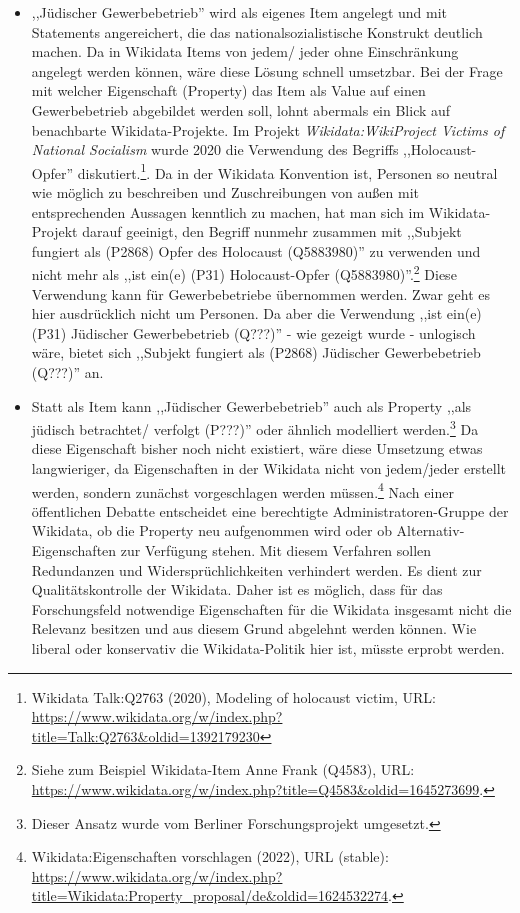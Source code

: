\begin{itemize}
    \item ,,Jüdischer Gewerbebetrieb'' wird als eigenes Item angelegt und mit Statements angereichert, die das nationalsozialistische Konstrukt deutlich machen. Da in Wikidata Items von jedem/ jeder ohne Einschränkung angelegt werden können, wäre diese Lösung schnell umsetzbar. Bei der Frage mit welcher Eigenschaft (Property) das Item als Value auf einen Gewerbebetrieb abgebildet werden soll, lohnt abermals ein Blick auf benachbarte Wikidata-Projekte. Im Projekt \textit{Wikidata:WikiProject Victims of National Socialism} wurde 2020 die Verwendung des Begriffs ,,Holocaust-Opfer'' diskutiert.\footnote{Wikidata Talk:Q2763 (2020), Modeling of holocaust victim, URL: \url{https://www.wikidata.org/w/index.php?title=Talk:Q2763&oldid=1392179230}}. Da in der Wikidata Konvention ist, Personen so neutral wie möglich zu beschreiben und Zuschreibungen von außen mit entsprechenden Aussagen kenntlich zu machen, hat man sich im Wikidata-Projekt darauf geeinigt, den Begriff nunmehr zusammen mit ,,Subjekt fungiert als (P2868) Opfer des Holocaust (Q5883980)'' zu verwenden und nicht mehr als ,,ist ein(e) (P31) Holocaust-Opfer (Q5883980)''.\footnote{Siehe zum Beispiel Wikidata-Item Anne Frank (Q4583), URL: \url{https://www.wikidata.org/w/index.php?title=Q4583&oldid=1645273699}.} Diese Verwendung kann für Gewerbebetriebe übernommen werden. Zwar geht es hier ausdrücklich nicht um Personen. Da aber die Verwendung ,,ist ein(e) (P31) Jüdischer Gewerbebetrieb (Q???)'' - wie gezeigt wurde - unlogisch wäre, bietet sich ,,Subjekt fungiert als (P2868) Jüdischer Gewerbebetrieb (Q???)'' an.
    \item Statt als Item kann ,,Jüdischer Gewerbebetrieb'' auch als Property ,,als jüdisch betrachtet/ verfolgt (P???)'' oder ähnlich modelliert werden.\footnote{Dieser Ansatz wurde vom Berliner Forschungsprojekt umgesetzt.} Da diese Eigenschaft bisher noch nicht existiert, wäre diese Umsetzung etwas langwieriger, da Eigenschaften in der Wikidata nicht von jedem/jeder erstellt werden, sondern zunächst vorgeschlagen werden müssen.\footnote{Wikidata:Eigenschaften vorschlagen (2022), URL (stable): \url{https://www.wikidata.org/w/index.php?title=Wikidata:Property_proposal/de&oldid=1624532274}.} Nach einer öffentlichen Debatte entscheidet eine berechtigte Administratoren-Gruppe der Wikidata, ob die Property neu aufgenommen wird oder ob Alternativ-Eigenschaften zur Verfügung stehen. Mit diesem Verfahren sollen Redundanzen und Widersprüchlichkeiten verhindert werden. Es dient zur Qualitätskontrolle der Wikidata. Daher ist es möglich, dass für das Forschungsfeld notwendige Eigenschaften für die Wikidata insgesamt nicht die Relevanz besitzen und aus diesem Grund abgelehnt werden können. Wie liberal oder konservativ die Wikidata-Politik hier ist, müsste erprobt werden.      
\end{itemize} 


